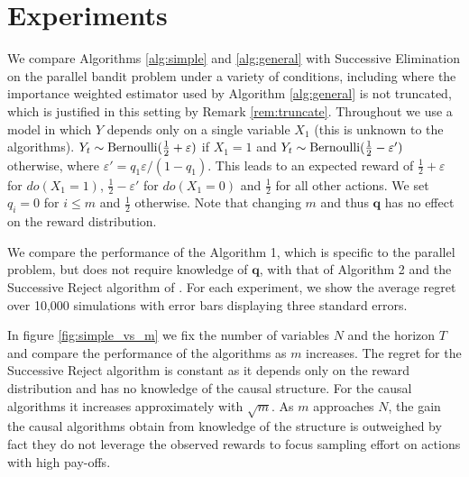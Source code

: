 \documentclass{article}
\newcommand{\eq}[1]{\begin{align*}#1\end{align*}}
\theoremstyle{plain}
\theoremstyle{definition}
\let\epsilon\varepsilon
\begin{document}
 
\section{Experiments}
\label{sec:experiments}

We compare Algorithms \ref{alg:simple} and \ref{alg:general} with Successive Elimination on the parallel bandit problem
under a variety of conditions, including where the importance weighted estimator used by Algorithm \ref{alg:general} is not truncated,
which is justified in this setting by Remark \ref{rem:truncate}. Throughout we use a model in which $Y$ depends only on a single variable $X_1$ (this is unknown to the algorithms). $Y_t \sim \bernoulli(\frac{1}{2}+\epsilon)$ if $X_1=1$ and $Y_t \sim \bernoulli(\frac{1}{2}-\epsilon')$ otherwise, where $\epsilon' = q_1\epsilon/(1-q_1)$. This leads to an expected reward of $\frac{1}{2}+\epsilon$ for $do(X_1=1)$, $\frac{1}{2}-\epsilon'$ for $do(X_1=0)$ and $\frac{1}{2}$ for all other actions. We set $q_i = 0$ for $i \leq m$ and $\frac{1}{2}$ otherwise. Note that changing $m$ and thus $\boldsymbol{q}$ has no effect on the reward distribution. 


We compare the performance of the Algorithm 1, which is specific to the parallel problem, but does not require knowledge of $\boldsymbol{q}$, with that of Algorithm 2 and the Successive Reject algorithm of \cite{audibert2010best}. For each experiment, we show the average regret over 10,000 simulations with error bars displaying three standard errors.

In figure \ref{fig:simple_vs_m} we fix the number of variables $N$ and the horizon $T$ and compare the performance of the algorithms as $m$ increases. The regret for the Successive Reject algorithm is constant as it depends only on the reward distribution and has no knowledge of the causal structure. For the causal algorithms it increases approximately with $\sqrt{m}$. As $m$ approaches $N$, the gain the causal algorithms obtain from knowledge of the structure is outweighed by fact they do not leverage the observed rewards to focus sampling effort on actions with high pay-offs.
\end{document}
